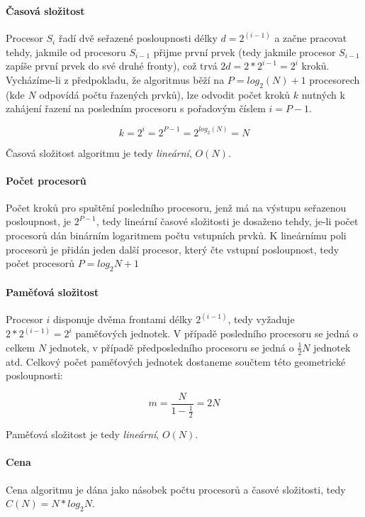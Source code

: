 \documentclass[12pt,a4paper,titlepage,final]{article}
\begin{document}
\paragraph{Časová složitost}
Procesor $S_i$ řadí dvě seřazené posloupnosti délky $d = 2^{(i-1)}$ a začne pracovat tehdy, jakmile od procesoru $S_{i-1}$ přijme první prvek (tedy jakmile procesor $S_{i-1}$ zapíše první prvek do své druhé fronty), což trvá $2d = 2*2^{i-1} = 2^{i}$ kroků. Vycházíme-li z předpokladu, že algoritmus běží na $P = log_{2}(N) + 1$ procesorech (kde $N$ odpovídá počtu řazených prvků), lze odvodit počet kroků $k$ nutných k zahájení řazení na posledním procesoru s pořadovým číslem $i = P - 1$.

\begin{equation}
k = 2^{i} = 2^{P - 1} = 2^{log_{2}(N)} = N
\end{equation}

Časová složitost algoritmu je tedy \textit{lineární}, $O(N)$.

\paragraph{Počet procesorů}
Počet kroků pro spuštění posledního procesoru, jenž má na výstupu seřazenou posloupnost, je $2^{P - 1}$, tedy lineární časové složitosti je dosaženo tehdy, je-li počet procesorů dán binárním logaritmem počtu vstupních prvků. K lineárnímu poli procesorů je přidán jeden další procesor, který čte vstupní posloupnost, tedy počet procesorů $P = log_2{N} + 1$

\paragraph{Paměťová složitost}
Procesor $i$ disponuje dvěma frontami délky $2^{(i-1)}$, tedy vyžaduje $2*2^{(i-1)} = 2^i$ paměťových jednotek. V případě posledního procesoru se jedná o celkem $N$ jednotek, v případě předposledního procesoru se jedná o $\frac{1}{2}N$ jednotek atd. Celkový počet paměťových jednotek dostaneme součtem této geometrické posloupnosti:

\begin{equation}
m = \frac{N}{1-\frac{1}{2}} = 2N
\end{equation}

Paměťová složitost je tedy \textit{lineární}, $O(N)$.

\paragraph{Cena}
Cena algoritmu je dána jako násobek počtu procesorů a časové složitosti, tedy $C(N) = N*log_2{N}$.
\end{document}
